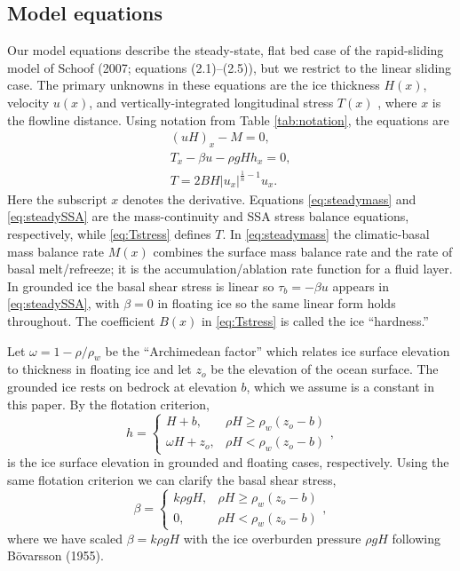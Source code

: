 \documentclass[twocolumn,letterpaper]{igs}
\renewcommand{\dh}{\fontencoding{T1}\selectfont{\symbol{240}}}
\newcommand{\citebod}{B\"o\dh varsson (1955)\nocite{Bodvardsson}\xspace}
\begin{document}
\subsection*{Model equations}  Our model equations describe the steady-state, flat bed case of the rapid-sliding model of Schoof\nocite{SchoofMarine1} (2007; equations (2.1)--(2.5)), but we restrict to the linear sliding case.  The primary unknowns in these equations are the ice thickness $H(x)$, velocity $u(x)$, and vertically-integrated longitudinal stress $T(x)$ \citep{SchoofStream}, where $x$ is the flowline distance.  Using notation from Table \ref{tab:notation}, the equations are
\begin{gather}
(uH)_x - M = 0, \label{eq:steadymass} \\
T_x - \beta u - \rho g H h_x = 0, \label{eq:steadySSA} \\
T = 2 B H |u_x|^{\frac{1}{n}-1} u_x. \label{eq:Tstress}
\end{gather}
Here the subscript $x$ denotes the derivative.  Equations \eqref{eq:steadymass} and \eqref{eq:steadySSA} are the mass-continuity and SSA stress balance equations, respectively, while \eqref{eq:Tstress} defines $T$.  In \eqref{eq:steadymass} the climatic-basal mass balance rate $M(x)$ \citep{massbalanceglossary} combines the surface mass balance rate and the rate of basal melt/refreeze; it is the accumulation/ablation rate function for a fluid layer.  In grounded ice the basal shear stress is linear so $\tau_b = - \beta u$ \citep{MacAyeal} appears in \eqref{eq:steadySSA}, with $\beta=0$ in floating ice so the same linear form holds throughout.  The coefficient $B(x)$ in \eqref{eq:Tstress} is called the ice ``hardness.''

Let $\omega = 1 - \rho/\rho_w$ be the ``Archimedean factor'' which relates ice surface elevation to thickness in floating ice and let $z_o$ be the elevation of the ocean surface.  The grounded ice rests on bedrock at elevation $b$, which we assume is a constant in this paper.  By the flotation criterion,
\begin{equation}
h = \begin{cases} H+b,            & \rho H \ge \rho_w (z_o - b) \\
                  \omega H + z_o, & \rho H < \rho_w (z_o - b) \end{cases}, \label{eq:surface}
\end{equation}
is the ice surface elevation in grounded and floating cases, respectively.  Using the same flotation criterion we can clarify the basal shear stress,
\begin{equation}
\beta = \begin{cases} k \rho g H,    & \rho H \ge \rho_w (z_o - b) \\
                      0,          & \rho H < \rho_w (z_o - b) \end{cases}, \label{eq:betafull}
\end{equation}
where we have scaled $\beta = k \rho g H$ with the ice overburden pressure $\rho g H$ following \citebod.
\end{document}
